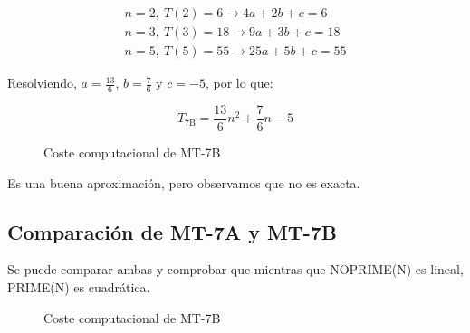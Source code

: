 \begin{subequations}
    \begin{gather*}
        n = 2,\ T(2) = 6  \rightarrow 4a  + 2b + c = 6 \\
        n = 3,\ T(3) = 18 \rightarrow 9a  + 3b + c = 18 \\
        n = 5,\ T(5) = 55 \rightarrow 25a + 5b + c = 55
    \end{gather*}
\end{subequations}

Resolviendo, $a=\frac{13}{6}$, $b=\frac{7}{6}$ y $c=-5$, por lo que:

\begin{equation}
    T_{\mathrm{7B}} = \frac{13}{6}n^2 + \frac{7}{6}n - 5
\end{equation}

\begin{figure}[H]
    \centering
    
    \caption{ Coste computacional de MT-7B}
\end{figure}

Es una buena aproximación, pero observamos que no es exacta.



\subsection{Comparación de MT-7A y MT-7B}

Se puede comparar ambas y comprobar que mientras que NOPRIME(N) es lineal, PRIME(N) es cuadrática.

\begin{figure}[H]
    \centering
    
    \caption{ Coste computacional de MT-7B}
\end{figure}